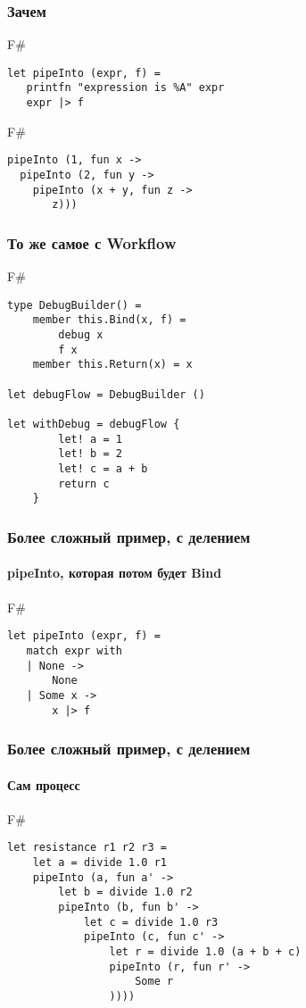 \documentclass[xetex,mathserif,serif]{beamer}
\begin{document}
	\begin{frame}[fragile]
		\frametitle{Зачем}
   		\begin{exampleblock}{F\#}
   			\begin{lstlisting}
let pipeInto (expr, f) =
   printfn "expression is %A" expr 
   expr |> f 
\end{lstlisting}
\end{exampleblock}
   		\begin{exampleblock}{F\#}
   			\begin{lstlisting}
pipeInto (1, fun x ->
  pipeInto (2, fun y -> 
    pipeInto (x + y, fun z -> 
       z)))
\end{lstlisting}
\end{exampleblock}
\end{frame}

	\begin{frame}[fragile]
		\frametitle{То же самое с Workflow}
   		\begin{exampleblock}{F\#}
   			\begin{lstlisting}
type DebugBuilder() =
    member this.Bind(x, f) = 
        debug x 
        f x
    member this.Return(x) = x

let debugFlow = DebugBuilder ()

let withDebug = debugFlow {
        let! a = 1
        let! b = 2
        let! c = a + b
        return c
    }
\end{lstlisting}
\end{exampleblock}
\end{frame}

	\begin{frame}[fragile]
		\frametitle{Более сложный пример, с делением}
		\framesubtitle{pipeInto, которая потом будет Bind}
   		\begin{exampleblock}{F\#}
   			\begin{lstlisting}
let pipeInto (expr, f) =
   match expr with
   | None -> 
       None
   | Some x -> 
       x |> f
\end{lstlisting}
\end{exampleblock}
\end{frame}

	\begin{frame}[fragile]
		\frametitle{Более сложный пример, с делением}
		\framesubtitle{Сам процесс}
   		\begin{exampleblock}{F\#}
   			\begin{lstlisting}
let resistance r1 r2 r3 = 
    let a = divide 1.0 r1
    pipeInto (a, fun a' ->
        let b = divide 1.0 r2
        pipeInto (b, fun b' ->
            let c = divide 1.0 r3
            pipeInto (c, fun c' ->
                let r = divide 1.0 (a + b + c)
                pipeInto (r, fun r' ->
                    Some r
                ))))
\end{lstlisting}
\end{exampleblock}
\end{frame}
\end{document}
